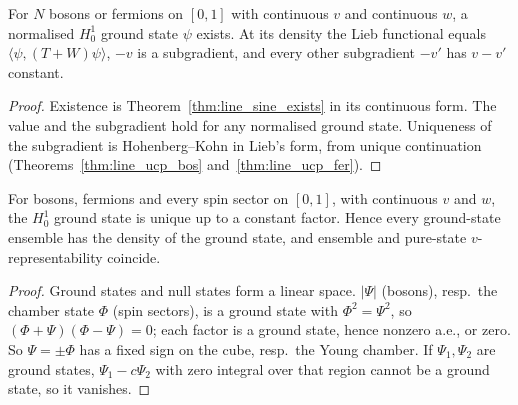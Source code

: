 \begin{theorem}
  \label{thm:line_lieb_cont}
  \leanok
  For $N$ bosons or fermions on $[0,1]$ with continuous $v$ and continuous $w$, a normalised $H^1_0$ ground state $\psi$
  exists. At its density the Lieb functional equals $\langle\psi,(T+W)\psi\rangle$, $-v$ is a subgradient, and every
  other subgradient $-v'$ has $v-v'$ constant.
\end{theorem}
\begin{proof}
  \leanok
  Existence is Theorem~\ref{thm:line_sine_exists} in its continuous form. The value and the subgradient hold for any
  normalised ground state. Uniqueness of the subgradient is Hohenberg--Kohn in Lieb's form, from unique continuation
  (Theorems~\ref{thm:line_ucp_bos} and~\ref{thm:line_ucp_fer}).
\end{proof}

\begin{theorem}
  \label{thm:line_nondeg_cont}
  \leanok
  For bosons, fermions and every spin sector on $[0,1]$, with continuous $v$ and $w$, the $H^1_0$ ground state is
  unique up to a constant factor. Hence every ground-state ensemble has the density of the ground state, and
  ensemble and pure-state $v$-representability coincide.
\end{theorem}
\begin{proof}
  \leanok
  Ground states and null states form a linear space. $|\Psi|$ (bosons), resp.\ the chamber state $\Phi$ (spin sectors),
  is a ground state with $\Phi^2=\Psi^2$, so $(\Phi+\Psi)(\Phi-\Psi)=0$; each factor is a ground state, hence nonzero a.e.,
  or zero. So $\Psi=\pm\Phi$ has a fixed sign on the cube, resp.\ the Young chamber. If $\Psi_1,\Psi_2$ are ground
  states, $\Psi_1-c\Psi_2$ with zero integral over that region cannot be a ground state, so it vanishes.
\end{proof}

